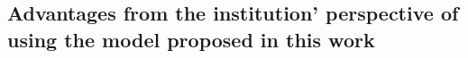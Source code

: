 \documentclass[runningheads]{llncs}
\begin{document}



\subsection{Advantages from the institution' perspective of using the model proposed in this work}
\label{institution_model}
\end{document}
